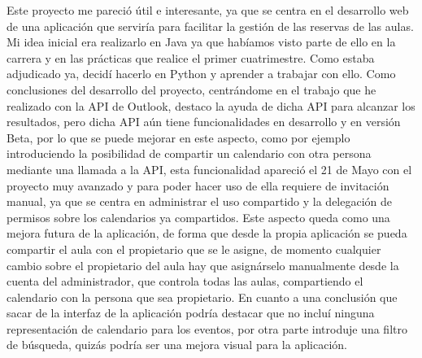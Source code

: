 
Este proyecto me pareció útil e interesante, ya que se centra en el desarrollo web de una aplicación que serviría para facilitar la gestión de las reservas de las aulas. Mi idea inicial era realizarlo en Java ya que habíamos visto parte de ello en la carrera y en las prácticas que realice el primer cuatrimestre. Como estaba adjudicado ya, decidí hacerlo en Python y aprender a trabajar con ello.
\newline
Como conclusiones del desarrollo del proyecto, centrándome en el trabajo que he realizado con la API de Outlook, destaco la ayuda de dicha API para alcanzar los resultados, pero dicha API aún tiene funcionalidades en desarrollo y en versión Beta, por lo que se puede mejorar en este aspecto, como por ejemplo introduciendo la posibilidad de compartir un calendario con otra persona mediante una llamada a la API, esta funcionalidad apareció el 21 de Mayo con el proyecto muy avanzado y para poder hacer uso de ella requiere de invitación manual, ya que se centra en administrar el uso compartido y la delegación de permisos sobre los calendarios ya compartidos. Este aspecto queda como una mejora futura de la aplicación, de forma que desde la propia aplicación se pueda compartir el aula con el propietario que se le asigne, de momento cualquier cambio sobre el propietario del aula hay que asignárselo manualmente desde la cuenta del administrador, que controla todas las aulas, compartiendo el calendario con la persona que sea propietario.\newline
En cuanto a una conclusión que sacar de la interfaz de la aplicación podría destacar que no incluí ninguna representación de calendario para los eventos, por otra parte introduje una filtro de búsqueda, quizás podría ser una mejora visual para la aplicación.


